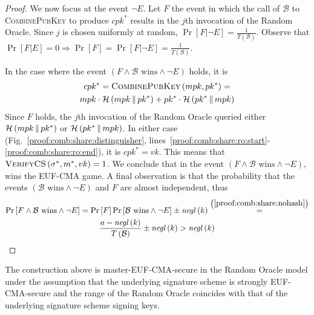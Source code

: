 \begin{proof}
      We now focus at the event $\neg E$. Let $F$ the event in which the call of
      $\mathcal{B}$ to \textsc{CombinePubKey} to produce $cpk^*$ results in
      the $j$th invocation of the Random Oracle. Since $j$ is chosen uniformly
      at random, $\Pr\left[F | \neg E\right] =
      \frac{1}{T\left(\mathcal{B}\right)}$. Observe that $\Pr\left[F | E\right]
      = 0 \Rightarrow \Pr\left[F\right] = \Pr\left[F | \neg E\right] =
      \frac{1}{T\left(\mathcal{B}\right)}$.

      In the case where the event $\left(F \wedge \mathcal{B} \text{ wins}
      \wedge \neg E\right)$ holds, it is
      \begin{gather*}
        cpk^* = \textsc{CombinePubKey}\left(mpk, pk^*\right) = \\
        mpk \cdot \mathcal{H}\left(mpk \,\|\, pk^*\right) + pk^* \cdot
        \mathcal{H}\left(pk^* \,\|\, mpk\right)
      \end{gather*}
      Since $F$ holds, the $j$th invocation of the Random Oracle queried either
      $\mathcal{H}\left(mpk \,\|\, pk^*\right)$ or $\mathcal{H}\left(pk^*
      \,\|\, mpk\right)$. In either case
      (Fig.~\ref{proof:comb:share:distinguisher},
      lines~\ref{proof:comb:share:ro:start}-\ref{proof:comb:share:ro:end}), it
      is $cpk^* = vk$. This means that $\textsc{VerifyCS}\left(\sigma^*, m^*,
      vk\right) = 1$. We conclude that in the event $\left(F \wedge \mathcal{B}
      \text{ wins} \wedge \neg E\right)$, \adversary{} wins the \textsf{EUF-CMA}
      game. A final observation is that the probability that the events
      $\left(\mathcal{B} \text{ wins} \wedge \neg E\right)$ and $F$ are almost
      independent, thus
      \begin{gather*}
        \Pr\left[F \wedge \mathcal{B} \text{ wins} \wedge \neg E\right] =
        \Pr\left[F\right] \Pr\left[\mathcal{B} \text{ wins} \wedge \neg E\right]
        \pm \mathit{negl}\left(k\right)
        \overset{\left(\ref{proof:comb:share:nohash}\right)}{=} \\
        \frac{a - \mathit{negl}\left(k\right)}{T\left(\mathcal{B}\right)} \pm
        \mathit{negl}\left(k\right) > \mathit{negl}\left(k\right)
      \end{gather*}
    \end{proof}

    \begin{lemma}
      \label{lemma:comb:master}
      The construction above is \textsf{master-EUF-CMA}-secure in the Random
      Oracle model under the assumption that the underlying signature scheme is
      strongly \textsf{EUF-CMA}-secure and the range of the Random Oracle
      coincides with that of the underlying signature scheme signing keys.
    \end{lemma}

